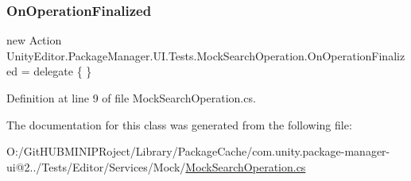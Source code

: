 \subsubsection{\texorpdfstring{OnOperationFinalized}{OnOperationFinalized}}
{\footnotesize\ttfamily new Action Unity\+Editor.\+Package\+Manager.\+U\+I.\+Tests.\+Mock\+Search\+Operation.\+On\+Operation\+Finalized = delegate \{ \}}



Definition at line 9 of file Mock\+Search\+Operation.\+cs.



The documentation for this class was generated from the following file\+:\begin{DoxyCompactItemize}
\item 
O\+:/\+Git\+H\+U\+B\+M\+I\+N\+I\+P\+Roject/\+Library/\+Package\+Cache/com.\+unity.\+package-\/manager-\/ui@2../\+Tests/\+Editor/\+Services/\+Mock/\mbox{\hyperlink{_mock_search_operation_8cs}{Mock\+Search\+Operation.\+cs}}\end{DoxyCompactItemize}
